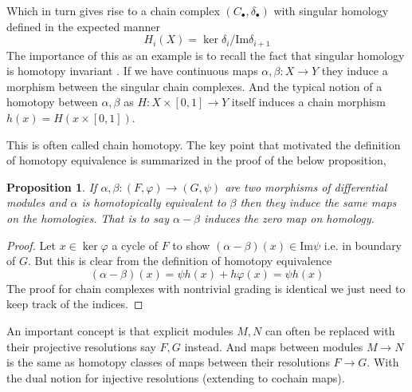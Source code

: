 \documentclass[12pt]{article}
\numberwithin{equation}{section}
\newcommand{\image}{{\mathrm{Im}}}
\newtheorem{proposition}{Proposition}[section]
\begin{document}
	Which in turn gives rise to a chain complex $(C_\bullet, \delta_\bullet)$ with singular homology defined in the expected manner \[ H_i(X)=\ker \delta_i/ \image \delta_{i+1	} \]
	The importance of this as an example is to recall the fact that singular homology is homotopy invariant \cite[Th. ~2.10]{hatcher}. If we have continuous maps $\alpha ,\beta :X \to Y$ they induce a morphism between the singular chain complexes. And the typical notion of a homotopy between $\alpha, \beta $ as $H:X \times [0,1] \to Y $ itself induces a chain morphism $h(x)=H(x\times [0,1])$.
	
	This is often called chain homotopy. The key point that motivated the definition of homotopy equivalence is summarized in the proof of the below proposition,
	\begin{proposition}
		If $\alpha, \beta: (F,\varphi) \to (G,\psi)$ are two morphisms of differential modules and $\alpha $ is homotopically equivalent to $\beta $ then they induce the same maps on the homologies. That is to say $\alpha- \beta $ induces the zero map on homology.
	\end{proposition}
	\begin{proof}
		Let $x \in \ker \varphi $ a cycle of $F$ to show $(\alpha - \beta) (x) \in \image \psi $ i.e. in boundary of $G$. But this is clear from the definition of homotopy equivalence 
		\[ (\alpha-\beta) (x)=\psi h (x) + h \varphi(x) = \psi h(x) \]
		The proof for chain complexes with nontrivial grading is identical we just need to keep track of the indices.
	\end{proof}
	
	An important concept is that explicit modules $M, N$ can often be replaced with their projective resolutions say $F,G$ instead. And maps between modules $M \to N$ is the same as homotopy classes of maps between their resolutions $F \to G$. With the dual notion for injective resolutions (extending to cochain maps).
	
\end{document}
